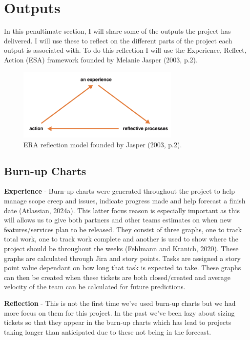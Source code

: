 \section{Outputs}
  In this penultimate section, I will share some of the outputs the project has delivered. I will use these to reflect on the different parts of the project
  each output is associated with. To do this reflection I will use the Experience, Reflect, Action (ESA) framework founded by Melanie Jasper (2003, p.2).

  \begin{figure}[H]
    \centering
    \includegraphics[width=8cm]{assets/eraReflection.png}
    \caption{ERA reflection model founded by Jasper (2003, p.2).}
    \label{fig:eraReflection}
  \end{figure}  

  \subsection{Burn-up Charts}
  \label{sec:burnup}
  
  \textbf{Experience} - Burn-up charts were generated throughout the project to help manage scope creep and issues, indicate progress made and help
  forecast a finish date (Atlassian, 2024a). This latter focus reason is especially important as this will allows us to give both partners and other 
  teams estimates on when new features/services plan to be released. They consist of three graphs, one to track total work, one to track work complete 
  and another is used to show where the project should be throughout the weeks (Fehlmann and Kranich, 2020). These graphs are calculated through Jira 
  and story points. Tasks are assigned a story point value dependant on how long that task is expected to take. These graphs can then be created when 
  these tickets are both closed/created and average velocity of the team can be calculated for future predictions.

  \vspace{0.2cm}
  \textbf{Reflection} - This is not the first time we've used burn-up charts but we had more focus on them for this project. In the past we've been 
  lazy about sizing tickets so that they appear in the burn-up charts which has lead to projects taking longer than anticipated due to these not 
  being in the forecast.

